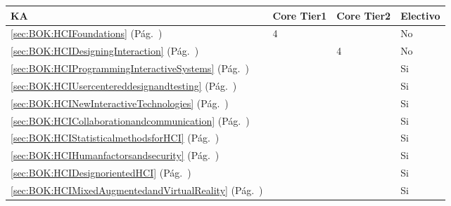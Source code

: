 \begin{center}
\begin{tabularx}{\textwidth}{|X|p{1cm}|p{1cm}|p{1.4cm}|}\hline
\textbf{\acf{KA}} & \textbf{Core Tier1} & \textbf{Core Tier2} & \textbf{Electivo} \\ \hline
\ref{sec:BOK:HCIFoundations} \htmlref{\HCIFoundations}{sec:BOK:HCIFoundations}\xspace (Pág.~\pageref{sec:BOK:HCIFoundations}) & 4 & ~ & No \\ \hline
\ref{sec:BOK:HCIDesigningInteraction} \htmlref{\HCIDesigningInteraction}{sec:BOK:HCIDesigningInteraction}\xspace (Pág.~\pageref{sec:BOK:HCIDesigningInteraction}) & ~ & 4 & No \\ \hline
\ref{sec:BOK:HCIProgrammingInteractiveSystems} \htmlref{\HCIProgrammingInteractiveSystems}{sec:BOK:HCIProgrammingInteractiveSystems}\xspace (Pág.~\pageref{sec:BOK:HCIProgrammingInteractiveSystems}) & ~ & ~ & Si \\ \hline
\ref{sec:BOK:HCIUsercentereddesignandtesting} \htmlref{\HCIUsercentereddesignandtesting}{sec:BOK:HCIUsercentereddesignandtesting}\xspace (Pág.~\pageref{sec:BOK:HCIUsercentereddesignandtesting}) & ~ & ~ & Si \\ \hline
\ref{sec:BOK:HCINewInteractiveTechnologies} \htmlref{\HCINewInteractiveTechnologies}{sec:BOK:HCINewInteractiveTechnologies}\xspace (Pág.~\pageref{sec:BOK:HCINewInteractiveTechnologies}) & ~ & ~ & Si \\ \hline
\ref{sec:BOK:HCICollaborationandcommunication} \htmlref{\HCICollaborationandcommunication}{sec:BOK:HCICollaborationandcommunication}\xspace (Pág.~\pageref{sec:BOK:HCICollaborationandcommunication}) & ~ & ~ & Si \\ \hline
\ref{sec:BOK:HCIStatisticalmethodsforHCI} \htmlref{\HCIStatisticalmethodsforHCI}{sec:BOK:HCIStatisticalmethodsforHCI}\xspace (Pág.~\pageref{sec:BOK:HCIStatisticalmethodsforHCI}) & ~ & ~ & Si \\ \hline
\ref{sec:BOK:HCIHumanfactorsandsecurity} \htmlref{\HCIHumanfactorsandsecurity}{sec:BOK:HCIHumanfactorsandsecurity}\xspace (Pág.~\pageref{sec:BOK:HCIHumanfactorsandsecurity}) & ~ & ~ & Si \\ \hline
\ref{sec:BOK:HCIDesignorientedHCI} \htmlref{\HCIDesignorientedHCI}{sec:BOK:HCIDesignorientedHCI}\xspace (Pág.~\pageref{sec:BOK:HCIDesignorientedHCI}) & ~ & ~ & Si \\ \hline
\ref{sec:BOK:HCIMixedAugmentedandVirtualReality} \htmlref{\HCIMixedAugmentedandVirtualReality}{sec:BOK:HCIMixedAugmentedandVirtualReality}\xspace (Pág.~\pageref{sec:BOK:HCIMixedAugmentedandVirtualReality}) & ~ & ~ & Si \\ \hline
\end{tabularx}
\end{center}
